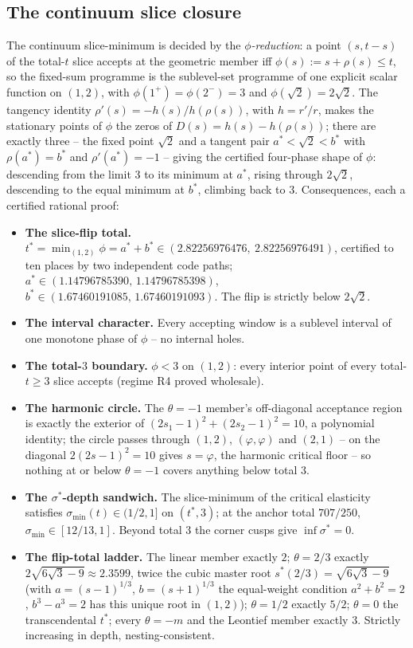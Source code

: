 
\subsection{The continuum slice closure}

The continuum slice-minimum is decided by the \emph{$\phi$-reduction}: a point $(s,t-s)$ of the total-$t$ slice accepts at the geometric member iff $\phi(s):=s+\rho(s)\le t$, so the fixed-sum programme is the sublevel-set programme of one explicit scalar function on $(1,2)$, with $\phi(1^+)=\phi(2^-)=3$ and $\phi(\sqrt2)=2\sqrt2$. The tangency identity $\rho'(s)=-h(s)/h(\rho(s))$, with $h=r'/r$, makes the stationary points of $\phi$ the zeros of $D(s)=h(s)-h(\rho(s))$; there are exactly three -- the fixed point $\sqrt2$ and a tangent pair $a^*<\sqrt2<b^*$ with $\rho(a^*)=b^*$ and $\rho'(a^*)=-1$ -- giving the certified four-phase shape of $\phi$: descending from the limit $3$ to its minimum at $a^*$, rising through $2\sqrt2$, descending to the equal minimum at $b^*$, climbing back to $3$. Consequences, each a certified rational proof:
\begin{itemize}[leftmargin=2em]
\item \textbf{The slice-flip total.} $t^*=\min_{(1,2)}\phi=a^*+b^*\in(2.82256976476,\ 2.82256976491)$, certified to ten places by two independent code paths; $a^*\in(1.14796785390,\,1.14796785398)$, $b^*\in(1.67460191085,\,1.67460191093)$. The flip is strictly below $2\sqrt2$.
\item \textbf{The interval character.} Every accepting window is a sublevel interval of one monotone phase of $\phi$ -- no internal holes.
\item \textbf{The total-$3$ boundary.} $\phi<3$ on $(1,2)$: every interior point of every total-$t\ge3$ slice accepts (regime R4 proved wholesale).
\item \textbf{The harmonic circle.} The $\theta=-1$ member's off-diagonal acceptance region is exactly the exterior of $(2s_1-1)^2+(2s_2-1)^2=10$, a polynomial identity; the circle passes through $(1,2)$, $(\varphi,\varphi)$ and $(2,1)$ -- on the diagonal $2(2s-1)^2=10$ gives $s=\varphi$, the harmonic critical floor -- so nothing at or below $\theta=-1$ covers anything below total $3$.
\item \textbf{The $\sigma^*$-depth sandwich.} The slice-minimum of the critical elasticity satisfies $\sigma_{\min}(t)\in(1/2,1]$ on $(t^*,3)$; at the anchor total $707/250$, $\sigma_{\min}\in[12/13,1]$. Beyond total $3$ the corner cusps give $\inf\sigma^*=0$.
\item \textbf{The flip-total ladder.} The linear member exactly $2$; $\theta=2/3$ exactly $2\sqrt{6\sqrt3-9}\approx2.3599$, twice the cubic master root $s^*(2/3)=\sqrt{6\sqrt3-9}$ (with $a=(s-1)^{1/3}$, $b=(s+1)^{1/3}$ the equal-weight condition $a^2+b^2=2$, $b^3-a^3=2$ has this unique root in $(1,2)$); $\theta=1/2$ exactly $5/2$; $\theta=0$ the transcendental $t^*$; every $\theta=-m$ and the Leontief member exactly $3$. Strictly increasing in depth, nesting-consistent.
\end{itemize}

